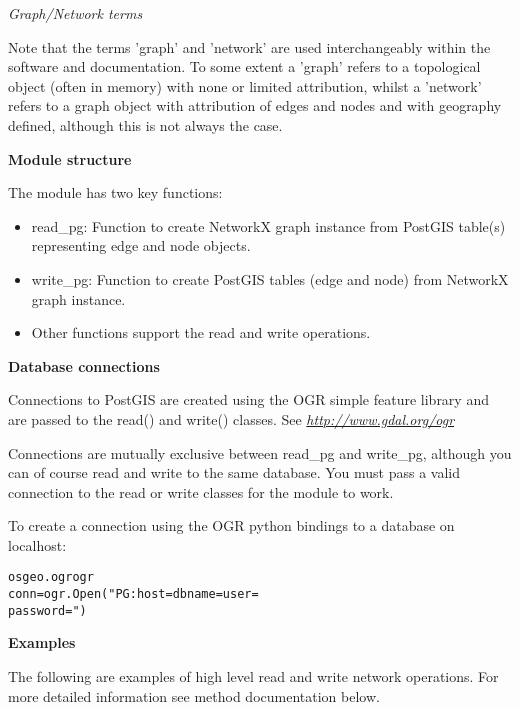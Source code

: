 \textit{Graph/Network terms}

Note that the terms 'graph' and 'network' are used interchangeably within 
the software and documentation. To some extent a 'graph' refers to a 
topological object (often in memory) with none or limited attribution, 
whilst a 'network' refers to a graph object with attribution of edges and 
nodes and with geography defined, although this is not always the case.

\textbf{Module structure}

The module has two key functions:

\begin{itemize}
\setlength{\parskip}{0.6ex}
  \item read\_pg: Function to create NetworkX graph instance from PostGIS 
    table(s) representing edge and node objects.

  \item write\_pg: Function to create PostGIS tables (edge and node) from 
    NetworkX graph instance.

  \item Other functions support the read and write operations.

\end{itemize}

\textbf{Database connections}

Connections to PostGIS are created using the OGR simple feature library and
are passed to the read() and write() classes. See 
\href{http://www.gdal.org/ogr}{\textit{http://www.gdal.org/ogr}}

Connections are mutually exclusive between read\_pg and write\_pg, although
you can of course read and write to the same database. You must pass a 
valid connection to the read or write classes for the module to work.

To create a connection using the OGR python bindings to a database on 
localhost:

\begin{alltt}
\pysrcprompt{{\textgreater}{\textgreater}{\textgreater} } osgeo.ogr  ogr
\pysrcprompt{{\textgreater}{\textgreater}{\textgreater} }conn = ogr.Open("PG: host= dbname= user=
\pysrcprompt{{\textgreater}{\textgreater}{\textgreater} }                password=")\end{alltt}
\textbf{Examples}

The following are examples of high level read and write network operations.
For more detailed information see method documentation below.

